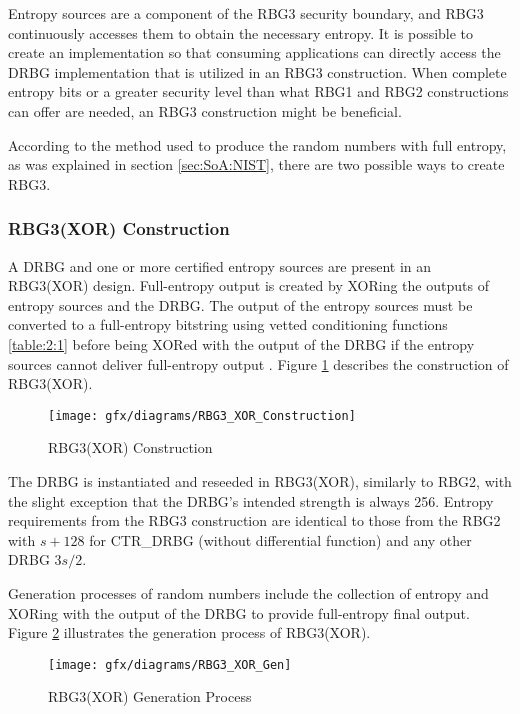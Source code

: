 Entropy sources are a component of the RBG3 security boundary, and RBG3 continuously accesses them to obtain the necessary entropy. It is possible to create an implementation so that consuming applications can directly access the DRBG implementation that is utilized in an RBG3 construction. When complete entropy bits or a greater security level than what RBG1 and RBG2 constructions can offer are needed, an RBG3 construction might be beneficial.

According to the method used to produce the random numbers with full entropy, as was explained in section \ref{sec:SoA:NIST}, there are two possible ways to create RBG3.

%
%
\subsubsection{RBG3(XOR) Construction}
\label{subsubsec:SoA:RBG3:XOR}
A DRBG and one or more certified entropy sources are present in an RBG3(XOR) design. Full-entropy output is created by XORing the outputs of entropy sources and the DRBG. The output of the entropy sources must be converted to a full-entropy bitstring using vetted conditioning functions \ref{table:2:1} before being XORed with the output of the DRBG if the entropy sources cannot deliver full-entropy output \cite{SP90C-2022}. Figure \ref{fig:3:5} describes the construction of RBG3(XOR).

\begin{figure}[htbp]
	\centering
	\texttt{[image: gfx/diagrams/RBG3\_XOR\_Construction]}
	\caption{RBG3(XOR) Construction \cite{SP90C-2022}}
	\label{fig:3:5}
\end{figure}

The DRBG is instantiated and reseeded in RBG3(XOR), similarly to RBG2, with the slight exception that the DRBG’s intended strength is always 256. Entropy requirements from the RBG3 construction are identical to those from the RBG2 with $s+128$ for CTR\_DRBG (without differential function) and any other DRBG $3s/2$. 

Generation processes of random numbers include the collection of entropy and XORing with the output of the DRBG to provide full-entropy final output. Figure \ref{fig:3:6} illustrates the generation process of RBG3(XOR).
\begin{figure}[htbp]
	\centering
	\texttt{[image: gfx/diagrams/RBG3\_XOR\_Gen]}
	\caption{RBG3(XOR) Generation Process \cite{SP90C-2022}}
	\label{fig:3:6}
\end{figure}

